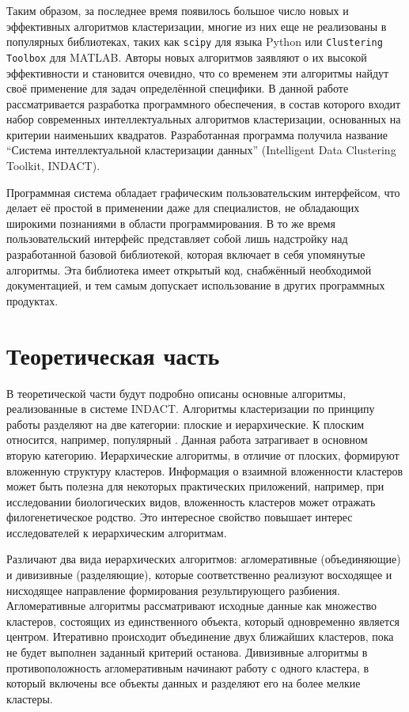 \documentclass[12pt]{diploma}
\begin{document}
		Таким образом, за последнее время появилось большое число новых и эффективных алгоритмов кластеризации, многие из них еще не реализованы в популярных библиотеках, таких как \texttt{scipy} для языка Python или  \texttt{Clustering Toolbox} для MATLAB. Авторы новых алгоритмов заявляют о их высокой эффективности и становится очевидно, что со временем эти алгоритмы найдут своё применение для задач определённой специфики. В данной работе рассматривается разработка программного обеспечения, в состав которого входит набор современных интеллектуальных алгоритмов кластеризации, основанных на критерии наименьших квадратов. Разработанная программа получила название ``Система интеллектуальной кластеризации данных'' (Intelligent Data Clustering Toolkit, INDACT).
		
		Программная система обладает графическим пользовательским интерфейсом, что делает её простой в применении даже для специалистов, не обладающих широкими познаниями в области программирования. В то же время пользовательский интерфейс представляет собой лишь надстройку над разработанной базовой библиотекой, которая включает в себя упомянутые алгоритмы. Эта библиотека имеет открытый код, снабжённый необходимой документацией, и тем самым допускает использование в других программных продуктах. 
		
	\section{Теоретическая часть}
	
	В теоретической части будут подробно описаны основные алгоритмы, реализованные в системе INDACT. Алгоритмы кластеризации по принципу работы разделяют на две категории: плоские и иерархические. К плоским относится, например, популярный \kmeans. Данная работа затрагивает в основном вторую категорию. Иерархические алгоритмы, в отличие от плоских, формируют вложенную структуру кластеров. Информация о взаимной вложенности кластеров может быть полезна для некоторых практических приложений, например, при исследовании биологических видов, вложенность кластеров может отражать филогенетическое родство. Это интересное свойство повышает интерес исследователей к иерархическим алгоритмам.
	
	Различают два вида иерархических алгоритмов: агломеративные (объединяющие) и дивизивные (разделяющие), которые соответственно реализуют восходящее и нисходящее направление формирования результирующего разбиения. Агломеративные алгоритмы рассматривают исходные данные как множество кластеров, состоящих из единственного объекта, который одновременно является центром. Итеративно происходит объединение двух ближайших кластеров, пока не будет выполнен заданный критерий останова. Дивизивные алгоритмы в противоположность агломеративным начинают работу с одного кластера, в который включены все объекты данных и разделяют его на более мелкие кластеры. 
	
\end{document}
